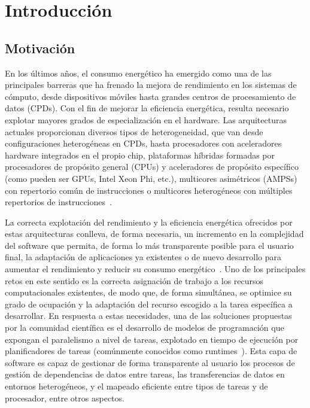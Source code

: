 \cleardoublepage


\chapter{Introducción}
\label{ch:chapter1}

\section{Motivación}

En los últimos años, el consumo energético ha emergido como una de las
principales barreras que ha frenado la mejora de rendimiento en los
sistemas de cómputo, desde dispositivos móviles hasta grandes centros de
procesamiento de datos (CPDs). Con el fin de mejorar la eficiencia
energética, resulta necesario explotar mayores grados de especialización en
el hardware. Las arquitecturas actuales proporcionan diversos tipos de
heterogeneidad, que van desde configuraciones heterogéneas en CPDs, hasta
procesadores con aceleradores hardware integrados en el propio chip,
plataformas híbridas formadas por procesadores de propósito general (CPUs)
y aceleradores de propósito específico (como pueden ser GPUs, Intel Xeon
Phi, etc.), multicores asimétricos (AMPSs) con repertorio común de
instrucciones o multicores heterogéneos con múltiples repertorios de
instrucciones~\cite{NRC2011,KoSh13}.



La correcta explotación del rendimiento y la eficiencia energética
ofrecidos por estas arquitecturas conlleva, de forma necesaria, un
incremento en la complejidad del software que permita, de forma lo más
transparente posible para el usuario final, la adaptación de aplicaciones
ya existentes o de nuevo desarrollo para aumentar el rendimiento y reducir
su consumo energético~\cite{OsTo10,SKC+15}. Uno de los principales retos en
este sentido es la correcta asignación de trabajo a los recursos
computacionales existentes, de modo que, de forma simultánea, se optimice
su grado de ocupación y la adaptación del recurso escogido a la tarea
específica a desarrollar. En respuesta a estas necesidades, una de las
soluciones propuestas por la comunidad científica es el desarrollo de
modelos de programación que expongan el paralelismo a nivel de tareas,
explotado en tiempo de ejecución por planificadores de tareas (comúnmente
conocidos como runtimes~\cite{VMC+14}). Esta capa de software es capaz de
gestionar de forma transparente al usuario los procesos de gestión de
dependencias de datos entre tareas, las transferencias de datos en entornos
heterogéneos, y el mapeado eficiente entre tipos de tareas y de procesador,
entre otros aspectos.

